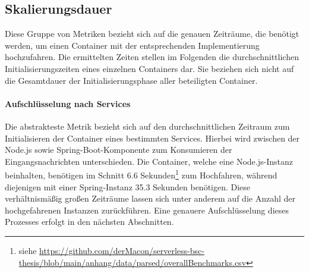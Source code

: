 \subsection{Skalierungsdauer}
Diese Gruppe von Metriken bezieht sich auf die genauen Zeiträume, die benötigt werden, um einen Container mit der entsprechenden Implementierung hochzufahren. Die ermittelten Zeiten stellen im Folgenden die durchschnittlichen Initialisierungszeiten eines einzelnen Containers dar. Sie beziehen sich nicht auf die Gesamtdauer der Initialisierungsphase aller beteiligten Container.


\paragraph{Aufschlüsselung nach Services}
Die abstrakteste Metrik bezieht sich auf den durchschnittlichen Zeitraum zum Initialisieren der Container eines bestimmten Services. Hierbei wird zwischen der Node.js sowie Spring-Boot-Komponente zum Konsumieren der Eingangsnachrichten unterschieden. Die Container, welche eine Node.js-Instanz beinhalten, benötigen im Schnitt 6.6 Sekunden\footnote{siehe \url{https://github.com/derMacon/serverless-bsc-thesis/blob/main/anhang/data/parsed/overallBenchmarks.csv}} zum Hochfahren, während diejenigen mit einer Spring-Instanz 35.3 Sekunden benötigen. Diese verhältnismäßig großen Zeiträume lassen sich unter anderem auf die Anzahl der hochgefahrenen Instanzen zurückführen. Eine genauere Aufschlüsselung dieses Prozesses erfolgt in den nächsten Abschnitten.

